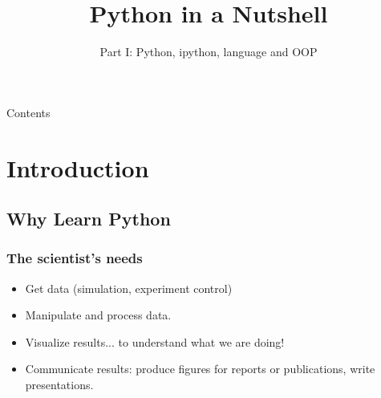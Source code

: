 \documentclass[colorlinks]{beamer}
\begin{document}
\setcounter{tocdepth}{2}

\title{ Python in a Nutshell}
\subtitle
 {Part I: Python, ipython, language and OOP } %

\begin{frame}[plain]
   \maketitle
\end{frame}
\begin{frame}[allowframebreaks]{Contents}
  \tableofcontents
\end{frame}
\section{Introduction}



\subsection{Why Learn Python}

\begin{frame}\frametitle{The scientist’s needs}
\small
\begin{itemize}
    \item Get data (simulation, experiment control)
    \item Manipulate and process data.
    \item Visualize results... to understand what we are doing!
    \item Communicate results: produce figures for reports or publications, write presentations.
\end{itemize}
\end{frame}
\end{document}
